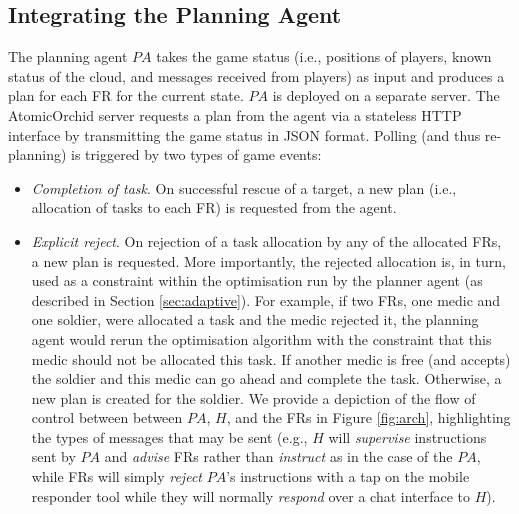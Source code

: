 
\subsection{Integrating the Planning Agent}
\noindent The planning agent $PA$ takes the game status (i.e., positions of players, known status of the cloud, and messages received from players) as input and produces a plan for each FR  for the current state. $PA$ is deployed on a separate server. The AtomicOrchid server requests a plan from the agent via a stateless HTTP interface by transmitting the game status in JSON format. Polling (and thus re-planning) is triggered by two types of game events:
\begin{itemize}
\item \textit{Completion of task}. On successful rescue of a target, a new plan (i.e., allocation of tasks to each FR) is requested from the agent.
\item \textit{Explicit reject}. On rejection of a task allocation by any of the allocated FRs, a new plan is requested.  More importantly, the rejected allocation is, in turn, used as a constraint within the optimisation run by the planner agent (as described in Section \ref{sec:adaptive}). For example, if two FRs, one medic and one soldier, were allocated a task and the medic rejected it, the planning agent would rerun the optimisation algorithm with the constraint that this medic should not be allocated this task. If another medic is free (and accepts) the soldier and this medic can go ahead and complete the task. Otherwise, a new plan is created for the soldier. We provide a depiction of the flow of control between  between $PA$, $H$, and the FRs in Figure \ref{fig:arch}, highlighting the types of messages that may be sent (e.g., $H$ will \emph{supervise} instructions sent by $PA$ and \emph{advise} FRs rather than \emph{instruct} as in the case of the $PA$, while FRs will simply \emph{reject} $PA$'s instructions with a tap on the mobile responder tool while they will normally \emph{respond} over a chat interface to $H$).
\end{itemize} 

